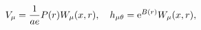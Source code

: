 \begin{equation}
V_\mu={1\over ae}P(r)W_\mu(x, r),\quad h_{\mu\theta}={\rm
e}^{B(r)}W_\mu(x,r),
\label{eq4}
\end{equation}

